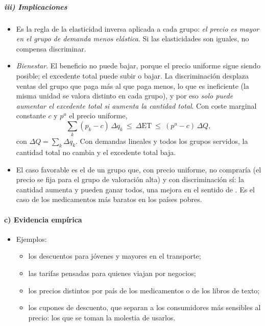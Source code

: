 \documentclass[11pt]{article}
\begin{document}
\subparagraph{iii) Implicaciones}

\begin{itemize}
\item Es la regla de la elasticidad inversa aplicada a cada grupo: \emph{el precio es mayor en el grupo de demanda menos elástica}. Si las elasticidades son iguales, no compensa discriminar.
\item \emph{Bienestar}. El beneficio no puede bajar, porque el precio uniforme sigue siendo posible; el excedente total puede subir o bajar. La discriminación desplaza ventas del grupo que paga más al que paga menos, lo que es ineficiente (la misma unidad se valora distinto en cada grupo), y por eso \emph{solo puede aumentar el excedente total si aumenta la cantidad total}\nocite{Schmalensee1981Output,Varian1985Price}. Con coste marginal constante $c$ y $p^u$ el precio uniforme,
  \begin{equation}
  \textstyle\sum_k(p_k-c)\,\Delta q_k\ \leq\ \Delta\mathrm{ET}\ \leq\ (p^u-c)\,\Delta Q ,
  \end{equation}
  con $\Delta Q=\sum_k\Delta q_k$. Con demandas lineales y todos los grupos servidos, la cantidad total no cambia y el excedente total baja\nocite{Robinson1933Economics}.
\item El caso favorable es el de un grupo que, con precio uniforme, no compraría (el precio se fija para el grupo de valoración alta) y con discriminación sí: la cantidad aumenta y pueden ganar todos, una mejora en el sentido de . Es el caso de los medicamentos más baratos en los países pobres.
\end{itemize}

\paragraph{c) Evidencia empírica}

\begin{itemize}
\item Ejemplos:
  \begin{itemize}
  \item los descuentos para jóvenes y mayores en el transporte;
  \item las tarifas pensadas para quienes viajan por negocios;
  \item los precios distintos por país de los medicamentos o de los libros de texto;
  \item los cupones de descuento, que separan a los consumidores más sensibles al precio: los que se toman la molestia de usarlos.
  \end{itemize}
\end{itemize}
\end{document}
